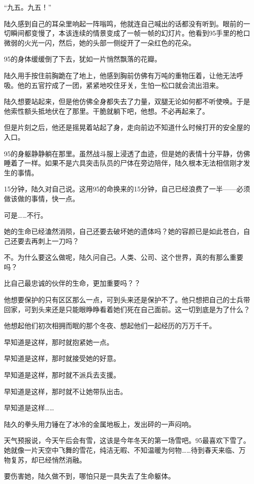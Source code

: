 “九五。九五！”

陆久感到自己的耳朵里响起一阵嗡鸣，他就连自己喊出的话都没有听到。眼前的一切瞬间都变慢了，本该连续的情景变成了一帧一帧的幻灯片。他看到95手里的枪口微弱的火光一闪，然后，她的头部一侧绽开了一朵红色的花朵。

95的身体缓缓倒了下去，犹如一片悄然飘落的花瓣。

陆久用手按住前胸跪在了地上，他感到胸前仿佛有万吨的重物压着，让他无法呼吸。他的五官拧成了一团，紧紧地咬住牙关，生怕一松口就会流出泪来。

陆久想要站起来，但是他仿佛全身都失去了力量，双腿无论如何都不听使唤。于是他索性额头抵地伏在了那里。干脆就躺下吧，他想。不必再起来了。

但是片刻之后，他还是摇晃着站起了身，走向前边不知道什么时候打开的安全屋的入口。

95的身躯静静躺在那里。虽然战斗服上浸透了血迹，但是她的表情十分平静，仿佛睡着了一样。如果不是六具突击队员的尸体在旁边陪伴，陆久根本无法相信刚才发生的事情。

15分钟，陆久对自己说。这用95的命换来的15分钟，自己已经浪费了一半——必须做该做的事情，快一点。

可是……不行。

她的生命已经溘然消陨，自己还要去破坏她的遗体吗？她的容颜已是如此苍白，自己还要去再刺上一刀吗？

不。为什么要这么做呢，陆久问自己。人类、公司、这个世界，真的有那么重要吗？

比自己最忠诚的伙伴的生命，更加重要吗？？

他想要保护的只有区区那么一点，可到头来还是保护不了。他只想把自己的士兵带回家，可到头来还是只能眼睁睁看着她们死在自己面前。这一切到底是为了什么？

他想起他们初次相拥而眠的那个冬夜、想起他们一起经历的万万千千。

早知道是这样，那时就抱紧她一点。

早知道是这样，那时就接受她的好意。

早知道是这样，那时就不派兵去支援。

早知道是这样，那时就不让她带队出击。

早知道是这样……

陆久的拳头用力锤在了冰冷的金属地板上，发出砰的一声闷响。

天气预报说，今天午后会有雪，这该是今年冬天的第一场雪吧。95最喜欢下雪了。她就像一片天空中飞舞的雪花，纯洁无暇、不知温暖为何物……待到春天来临、万物复苏，却已经悄然消融。

要伤害她，陆久做不到，哪怕只是一具失去了生命躯体。


